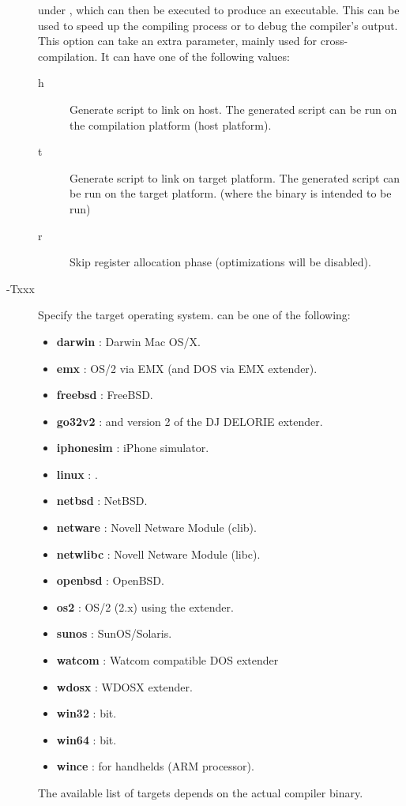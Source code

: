 \begin{description}
 under \linux, which can then be executed to produce an
executable. This can be used to speed up the compiling process or to debug
the compiler's output. This option can take an extra parameter, mainly
used for cross-compilation. It can have one of the following values:
\begin{description}
\item[h] Generate script to link on host. The generated script can be run on
the compilation platform (host platform).
\item[t] Generate script to link on target platform. The generated script
can be run on the target platform. (where the binary is intended to be run)
\item[r] Skip register allocation phase (optimizations will be disabled).
\end{description}
\item[-Txxx]  Specify the target operating system.  can be one of
the following:
\begin{itemize}
\item \textbf{darwin} : Darwin Mac OS/X.
\item \textbf{emx} : OS/2 via EMX (and DOS via EMX extender).
\item \textbf{freebsd} : FreeBSD.
\item \textbf{go32v2} : \dos and version 2 of the DJ DELORIE extender.
\item \textbf{iphonesim} : iPhone simulator.
\item \textbf{linux} : \linux.
\item \textbf{netbsd} : NetBSD.
\item \textbf{netware} : Novell Netware Module (clib).
\item \textbf{netwlibc} : Novell Netware Module (libc).
\item \textbf{openbsd} : OpenBSD.
\item \textbf{os2} : OS/2 (2.x) using the  extender.
\item \textbf{sunos} : SunOS/Solaris.
\item \textbf{watcom} : Watcom compatible DOS extender
\item \textbf{wdosx} : WDOSX extender.
\item \textbf{win32} :  bit.
\item \textbf{win64} :  bit.
\item \textbf{wince} : \windows for handhelds (ARM processor).
\end{itemize}
The available list of targets depends on the actual compiler binary.

\end{description}
